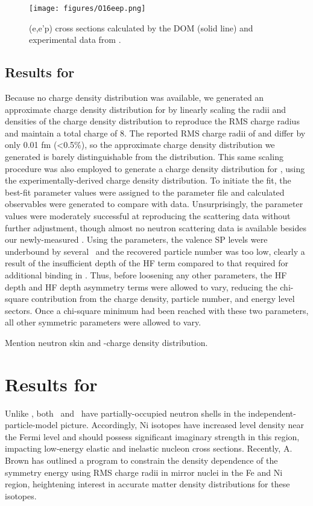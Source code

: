 \begin{figure}[tb]
    \centering
    \texttt{[image: figures/O16eep.png]}
    \caption[\oSix (e,e'p) cross sections calculated by the DOM]
    {
        \oSix (e,e'p) cross sections calculated by the DOM (solid line) and experimental data from
        \cite{Leuschner1994}.
    }
    \label{O16eep}
\end{figure}

\subsection{Results for \oEight}
Because no \oEight charge density distribution was available, we generated an approximate charge density
distribution for \oEight by linearly scaling
the radii and densities of the \oSix charge density distribution to reproduce the \oEight RMS charge
radius and maintain a total charge of 8. The reported RMS charge radii of \oSix and \oEight differ by only
0.01 fm (<0.5\%), so the approximate \oEight charge density distribution we generated is barely
distinguishable from the \oSix distribution. This same scaling procedure was also employed to
generate a charge density distribution for \snTwelve, using the
experimentally-derived \snFour charge density distribution. To initiate the fit, the \oSix best-fit parameter values
were assigned to the \oEight parameter file and calculated observables were generated to compare
with \oEight data. Unsurprisingly, the \oSix parameter values were moderately successful at reproducing
the \oEight scattering data without further adjustment, though almost no neutron scattering data is
available besides our newly-measured \tot. Using the \oSix parameters, the \oEight valence SP levels were underbound
by several \mega\electronvolt\ and the recovered particle number was too low, clearly a result of the insufficient
depth of the \oSix HF term compared to that required for additional binding in \oEight. Thus, before
loosening any other parameters, the HF depth and HF depth asymmetry terms were allowed to vary,
reducing the chi-square contribution from the charge density, particle number, and energy level
sectors. Once a chi-square minimum had been reached with these two parameters, all other symmetric parameters
were allowed to vary.

Mention neutron skin and \neEight-\oEight charge density distribution.

\section{Results for \niEightFour}
Unlike \caAughtEight, both \niEight\ and \niFour\ have partially-occupied neutron shells in the
independent-particle-model picture. Accordingly, Ni isotopes have increased level density near the
Fermi level and should possess significant imaginary strength in this region, impacting
low-energy elastic and inelastic nucleon cross sections. Recently, A. Brown has outlined a
program to constrain the density dependence of the symmetry energy using RMS charge radii in mirror
nuclei in the Fe and Ni region, heightening interest in accurate
matter density distributions for these isotopes.
